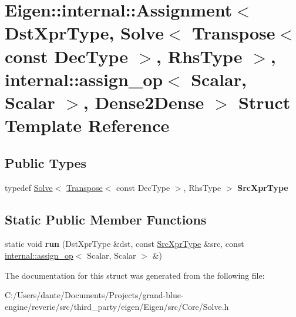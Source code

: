 \hypertarget{struct_eigen_1_1internal_1_1_assignment_3_01_dst_xpr_type_00_01_solve_3_01_transpose_3_01const_002733ef61eadb9652bc6bc1dd0938391}{}\section{Eigen\+::internal\+::Assignment$<$ Dst\+Xpr\+Type, Solve$<$ Transpose$<$ const Dec\+Type $>$, Rhs\+Type $>$, internal\+::assign\+\_\+op$<$ Scalar, Scalar $>$, Dense2\+Dense $>$ Struct Template Reference}
\label{struct_eigen_1_1internal_1_1_assignment_3_01_dst_xpr_type_00_01_solve_3_01_transpose_3_01const_002733ef61eadb9652bc6bc1dd0938391}
\subsection*{Public Types}
\begin{DoxyCompactItemize}
\item 
\mbox{\label{struct_eigen_1_1internal_1_1_assignment_3_01_dst_xpr_type_00_01_solve_3_01_transpose_3_01const_002733ef61eadb9652bc6bc1dd0938391_a5db89fee454b66d40d062899472d0234}} 
typedef \mbox{\hyperlink{class_eigen_1_1_solve}{Solve}}$<$ \mbox{\hyperlink{class_eigen_1_1_transpose}{Transpose}}$<$ const Dec\+Type $>$, Rhs\+Type $>$ {\bfseries Src\+Xpr\+Type}
\end{DoxyCompactItemize}
\subsection*{Static Public Member Functions}
\begin{DoxyCompactItemize}
\item 
\mbox{\label{struct_eigen_1_1internal_1_1_assignment_3_01_dst_xpr_type_00_01_solve_3_01_transpose_3_01const_002733ef61eadb9652bc6bc1dd0938391_a8a9a57d354125ef97f90e7c91a3f9b29}} 
static void {\bfseries run} (Dst\+Xpr\+Type \&dst, const \mbox{\hyperlink{class_eigen_1_1_solve}{Src\+Xpr\+Type}} \&src, const \mbox{\hyperlink{struct_eigen_1_1internal_1_1assign__op}{internal\+::assign\+\_\+op}}$<$ Scalar, Scalar $>$ \&)
\end{DoxyCompactItemize}


The documentation for this struct was generated from the following file\+:\begin{DoxyCompactItemize}
\item 
C\+:/\+Users/dante/\+Documents/\+Projects/grand-\/blue-\/engine/reverie/src/third\+\_\+party/eigen/\+Eigen/src/\+Core/Solve.\+h\end{DoxyCompactItemize}
